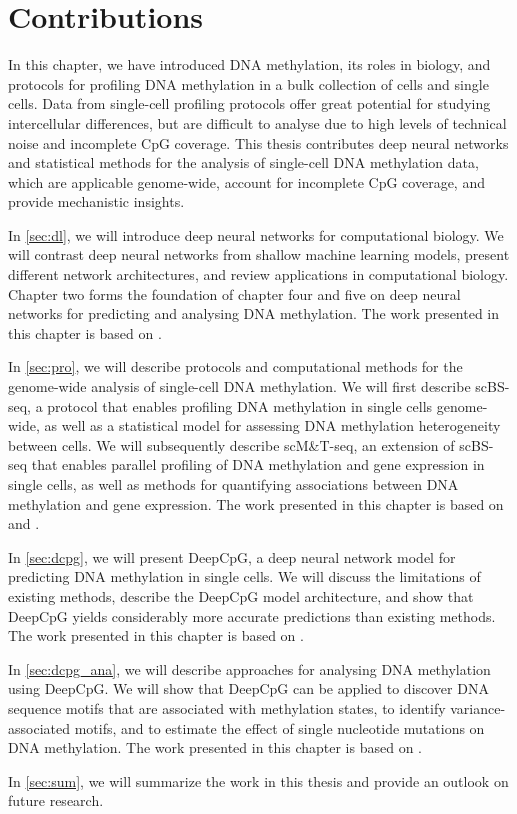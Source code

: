 \section{Contributions} \label{sec:intro_contrib}

In this chapter, we have introduced DNA methylation, its roles in biology, and protocols for profiling DNA methylation in a bulk collection of cells and single cells. Data from single-cell profiling protocols offer great potential for studying intercellular differences, but are difficult to analyse due to high levels of technical noise and incomplete CpG coverage. This thesis contributes deep neural networks and statistical methods for the analysis of single-cell DNA methylation data, which are applicable genome-wide, account for incomplete CpG coverage, and provide mechanistic insights.

In \cref{sec:dl}, we will introduce deep neural networks for computational biology. We will contrast deep neural networks from shallow machine learning models, present different network architectures, and review applications in computational biology. Chapter two forms the foundation of chapter four and five on deep neural networks for predicting and analysing DNA methylation. The work presented in this chapter is based on \citet{angermueller_deep_2016}.

In \cref{sec:pro}, we will describe protocols and computational methods for the genome-wide analysis of single-cell DNA methylation. We will first describe scBS-seq, a protocol that enables profiling DNA methylation in single cells genome-wide, as well as a statistical model for assessing DNA methylation heterogeneity between cells. We will subsequently describe scM\&T-seq, an extension of scBS-seq that enables parallel profiling of DNA methylation and gene expression in single cells, as well as methods for quantifying associations between DNA methylation and gene expression. The work presented in this chapter is based on \citet{smallwood_single-cell_2014} and \citet{angermueller_parallel_2016}.

In \cref{sec:dcpg}, we will present DeepCpG, a deep neural network model for predicting DNA methylation in single cells. We will discuss the limitations of existing methods, describe the DeepCpG model architecture, and show that DeepCpG yields considerably more accurate predictions than existing methods. The work presented in this chapter is based on \citet{angermueller_accurate_2017}.

In \cref{sec:dcpg_ana}, we will describe approaches for analysing DNA methylation using DeepCpG. We will show that DeepCpG can be applied to discover DNA sequence motifs that are associated with methylation states, to identify variance-associated motifs, and to estimate the effect of single nucleotide mutations on DNA methylation. The work presented in this chapter is based on \citet{angermueller_accurate_2017}.

In \cref{sec:sum}, we will summarize the work in this thesis and provide an outlook on future research.
